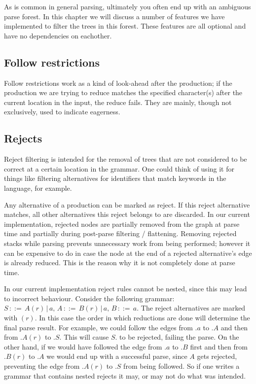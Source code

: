 \documentclass[a4paper,10pt]{article}
\begin{document}
As is common in general parsing, ultimately you often end up with an ambiguous parse forest. In this chapter we will discuss a number of features we have implemented to filter the trees in this forest. These features are all optional and have no dependencies on eachother.

\subsection{Follow restrictions}

Follow restrictions work as a kind of look-ahead after the production; if the production we are trying to reduce matches the specified character(s) after the current location in the input, the reduce fails. They are mainly, though not exclusively, used to indicate eagerness.

\subsection{Rejects}

Reject filtering is intended for the removal of trees that are not considered to be correct at a certain location in the grammar. One could think of using it for things like filtering alternatives for identifiers that match keywords in the language, for example.

Any alternative of a production can be marked as reject. If this reject alternative matches, all other alternatives this reject belongs to are discarded. In our current implementation, rejected nodes are partially removed from the graph at parse time and partially during post-parse filtering / flattening. Removing rejected stacks while parsing prevents unnecessary work from being performed; however it can be expensive to do in case the node at the end of a rejected alternative's edge is already reduced. This is the reason why it is not completely done at parse time.

In our current implementation reject rules cannot be nested, since this may lead to incorrect behaviour. Consider the following grammar: $S\,::=\,A(r)\,|\,a,\,A\,::=\,B(r)\,|\,a,\,B\,::=\,a$. The reject alternatives are marked with $(r)$. In this case the order in which reductions are done will determine the final parse result. For example, we could follow the edges from $.a$ to $.A$ and then from $.A(r)$ to $.S$. This will cause $S.$ to be rejected, failing the parse. On the other hand, if we would have followed the edge from $.a$ to $.B$ first and then from $.B(r)$ to $.A$ we would end up with a successful parse, since $A$ gets rejected, preventing the edge from $.A(r)$ to $.S$ from being followed. So if one writes a grammar that contains nested rejects it may, or may not do what was intended.
\end{document}
